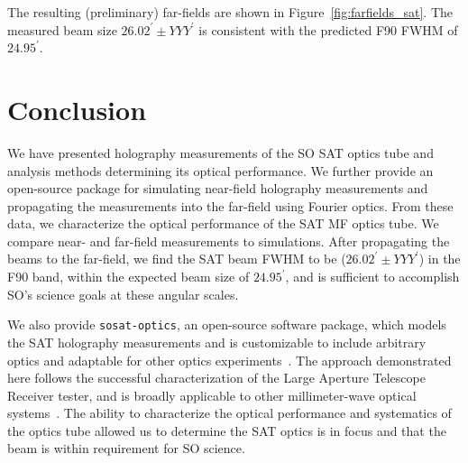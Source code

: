 The resulting (preliminary) far-fields are shown in Figure~\ref{fig:farfields_sat}.  The measured beam size $26.02^{\prime}\pm YYY^{\prime}$ is consistent with the predicted F90 FWHM of $24.95^{\prime}$.

\section{Conclusion}
\label{sec:sat_discussion}

We have presented holography measurements of the SO SAT optics tube and analysis methods determining its optical performance.  We further provide an open-source package for simulating near-field holography measurements and propagating the measurements into the far-field using Fourier optics.  From these data, we characterize the optical performance of the SAT MF optics tube.  We compare near- and far-field measurements to simulations.  After propagating the beams to the far-field, we find the SAT beam FWHM to be ($26.02^{\prime}\pm YYY^{\prime}$) in the F90 band, within the expected beam size of $24.95^{\prime}$, and is sufficient to accomplish SO's science goals at these angular scales.

We also provide \verb|sosat-optics|, an open-source software package, which models the SAT holography measurements and is customizable to include arbitrary optics and adaptable for other optics experiments~\cite{sat_sim_model}.  The approach demonstrated here follows the successful characterization of the Large Aperture Telescope Receiver tester, and is broadly applicable to other millimeter-wave optical systems~\cite{chesmore2022}.  The ability to characterize the optical performance and systematics of the optics tube allowed us to determine the SAT optics is in focus and that the beam is within requirement for SO science. 

